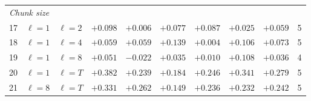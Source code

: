\begin{tabular}{rllrrrrrrr}
\midrule\multicolumn{10}{l}{\textit{Chunk size}} \\
17 & $\ell = 1$ & $\ell = 2$ & $+0.098$ & $+0.006$ & $+0.077$ & $+0.087$ & $+0.025$ & $+0.059$ & 5 \\
18 & $\ell = 1$ & $\ell = 4$ & $+0.059$ & $+0.059$ & $+0.139$ & $+0.004$ & $+0.106$ & $+0.073$ & 5 \\
19 & $\ell = 1$ & $\ell = 8$ & $+0.051$ & $-0.022$ & $+0.035$ & $+0.010$ & $+0.108$ & $+0.036$ & 4 \\
20 & $\ell = 1$ & $\ell = T$ & $+0.382$ & $+0.239$ & $+0.184$ & $+0.246$ & $+0.341$ & $+0.279$ & 5 \\
21 & $\ell = 8$ & $\ell = T$ & $+0.331$ & $+0.262$ & $+0.149$ & $+0.236$ & $+0.232$ & $+0.242$ & 5 \\
\bottomrule\end{tabular}

